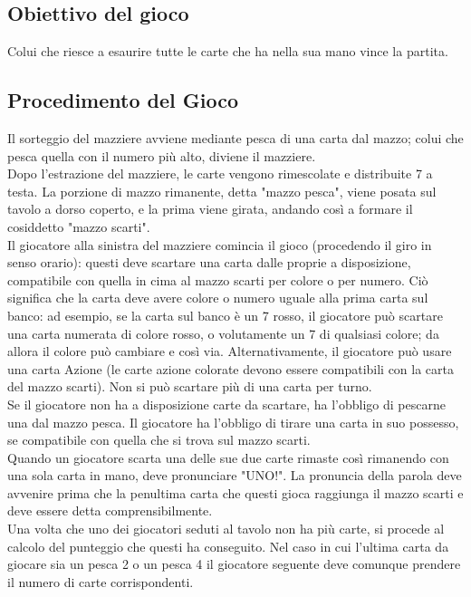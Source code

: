 		\subsection{Obiettivo del gioco}	
			Colui che riesce a esaurire tutte le carte che ha nella sua mano vince la partita.
			
		\subsection{Procedimento del Gioco}
			Il sorteggio del mazziere avviene mediante pesca di una carta dal mazzo; colui che pesca quella con il numero più alto, diviene il mazziere.	\\
			Dopo l'estrazione del mazziere, le carte vengono rimescolate e distribuite 7 a testa. La porzione di mazzo rimanente, detta "mazzo pesca", viene posata sul tavolo a dorso coperto, e la prima viene girata, andando così a formare il cosiddetto "mazzo scarti".\\
			Il giocatore alla sinistra del mazziere comincia il gioco (procedendo il giro in senso orario): questi deve scartare una carta dalle proprie a disposizione, compatibile con quella in cima al mazzo scarti per colore o per numero. Ciò significa che la carta deve avere colore o numero uguale alla prima carta sul banco: ad esempio, se la carta sul banco è un 7 rosso, il giocatore può scartare una carta numerata di colore rosso, o volutamente un 7 di qualsiasi colore; da allora il colore può cambiare e così via. Alternativamente, il giocatore può usare una carta Azione (le carte azione colorate devono essere compatibili con la carta del mazzo scarti). Non si può scartare più di una carta per turno.\\
			Se il giocatore non ha a disposizione carte da scartare, ha l'obbligo di pescarne una dal mazzo pesca. Il giocatore ha l'obbligo di tirare una carta in suo possesso, se compatibile con quella che si trova sul mazzo scarti. \\
			Quando un giocatore scarta una delle sue due carte rimaste così rimanendo con una sola carta in mano, deve pronunciare "UNO!". La pronuncia della parola deve avvenire prima che la penultima carta che questi gioca raggiunga il mazzo scarti e deve essere detta comprensibilmente.\\
			Una volta che uno dei giocatori seduti al tavolo non ha più carte, si procede al calcolo del punteggio che questi ha conseguito. Nel caso in cui l'ultima carta da giocare sia un pesca 2 o un pesca 4 il giocatore seguente deve comunque prendere il numero di carte corrispondenti.
		
